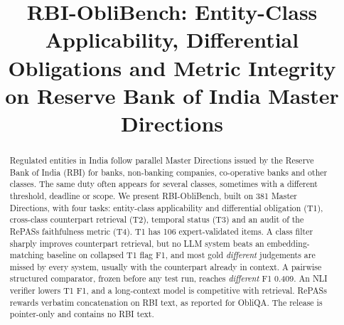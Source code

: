 \documentclass[conference]{IEEEtran}
\begin{document}
\title{RBI-ObliBench: Entity-Class Applicability, Differential Obligations and Metric Integrity on Reserve Bank of India Master Directions}

\author{
\and
{}
\and
{}
\and
{}
\and
{}
}

\maketitle

\begin{abstract}
Regulated entities in India follow parallel Master Directions issued by the Reserve Bank of India (RBI) for banks,
non-banking companies, co-operative banks and other classes. The same duty often appears for several classes, sometimes with a
different threshold, deadline or scope. We present RBI-ObliBench, built on 381 Master Directions,
with four tasks: entity-class applicability and differential obligation (T1), cross-class counterpart retrieval (T2), temporal status
(T3) and an audit of the RePASs faithfulness metric (T4). T1 has 106 expert-validated items.
A class filter sharply improves counterpart retrieval, but no LLM system beats an embedding-matching baseline on collapsed T1
flag F1, and most gold \textit{different} judgements are missed by every system, usually with the counterpart already in
context. A pairwise structured comparator, frozen before any test run, reaches \textit{different} F1 0.409. An NLI verifier lowers T1 F1, and a long-context model is competitive with retrieval. RePASs rewards verbatim
concatenation on RBI text, as reported for ObliQA. The release is pointer-only and contains no RBI text.
\end{abstract}
\end{document}
